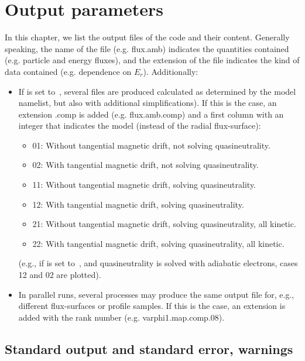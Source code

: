 \chapter{Output parameters}\label{CHAP_OUTPUT}

In this chapter, we list the output files of the code and their content. Generally speaking, the name of the file (e.g. {\ttfamily flux.amb}) indicates the quantities contained (e.g. particle and energy fluxes), and the extension of the file indicates the kind of data contained (e.g. dependence on $E_r$). Additionally:

\begin{itemize}

\item If  is set to~\true, several files are produced calculated as determined by the {\ttfamily model} namelist, but also with additional simplifications). If this is the case, an extension  {\ttfamily .comp} is added (e.g. {\ttfamily flux.amb.comp}) and a first column with an integer that indicates the model (instead of the radial flux-surface):
\begin{itemize}
\item 01: Without tangential magnetic drift, not solving quasineutrality.
\item 02: With tangential magnetic drift, not solving quasineutrality.
\item 11: Without tangential magnetic drift, solving quasineutrality.
\item 12: With tangential magnetic drift, solving quasineutrality.
\item 21: Without tangential magnetic drift, solving quasineutrality, all kinetic.
\item 22: With tangential magnetic drift, solving quasineutrality, all kinetic.
\end{itemize}
(e.g., if  is set to~\true, and quasineutrality is solved with adiabatic electrons, cases 12 and 02 are plotted).


\item In parallel runs, several processes may produce the same output file for, e.g., different flux-surfaces or profile samples. If this is the case, an extension is added with the rank number (e.g. {\ttfamily varphi1.map.comp.08}).
\end{itemize}

\section{Standard output and standard error, warnings}

